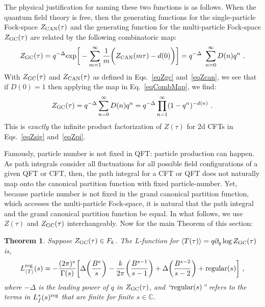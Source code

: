 \documentclass[11pt,a4paper]{article}
\newcommand{\G}{\Gamma}
\newtheorem{thm}{Theorem}[section]
\def\C{\mathbb{C}}
\newcommand{\reg}{{\rm reg}}
\begin{document}
The physical justification for naming these two functions is as follows. When the quantum field theory is free, then the generating functions for the single-particle Fock-space $Z_{\rm CAN}(\tau)$ and the generating function for the multi-particle Fock-space $Z_{\rm GC}(\tau)$ are related by the following combinatoric map:
\begin{align}
Z_{\rm GC}(\tau) = q^{-\Delta} {\rm exp}\bigg[- \sum_{m = 1}^{\infty} \frac{1}{m} \bigg( Z_{\rm CAN}(m \tau) - d(0) \bigg) \bigg] = q^{-\Delta} ~\sum_{n = 0}^{\infty} D(n) q^n~. \label{eqCombMap}
\end{align}
With $Z_{\rm GC}(\tau)$ and $Z_{\rm CAN}(\tau)$ as defined in Eqs.~\eqref{eqZgc} and~\eqref{eqZcan}, we see that if $D(0) = 1$ then applying the map in Eq.~\eqref{eqCombMap}, we find:
\begin{align}
Z_{\rm GC}(\tau) = q^{-\Delta} \sum_{n = 0}^{\infty} D(n)q^n = q^{-\Delta} \prod_{n = 1}^{\infty} (1-q^n)^{-d(n)}~.
\end{align}
This is {\em exactly} the infinite product factorization of $Z(\tau)$ for 2d CFTs in Eqs.~\eqref{eqZsig} and~\eqref{eqZpi}.

Famously, particle number is not fixed in QFT: particle production can happen. As path integrals consider all fluctuations for all possible field configurations of a given QFT or CFT, then, the path integral for a CFT or QFT does not naturally map onto the canonical partition function with fixed particle-number. Yet, because particle number is not fixed in the grand canonical partition function, which accesses the multi-particle Fock-space, it is natural that the path integral and the grand canonical partition function be equal. In what follows, we use $Z(\tau)$ and $Z_{\rm GC}(\tau)$ interchangeably. Now for the main Theorem of this section:

\begin{thm}\label{ThmTrex}
Suppose $Z_{\rm GC}(\tau) \in F_k$. The L-function for $\langle T(\tau) \rangle = q \partial_q \log Z_{\rm GC}(\tau)$ is,
\begin{align}
L_{\langle T \rangle}^\reg(s) = -\frac{(2 \pi)^s}{\G(s)} \bigg[ \Delta\bigg(\frac{B^s}{s}\bigg) - \frac{k}{2 \pi} \bigg( \frac{B^{s-1}}{s-1} \bigg) + \Delta \bigg(\frac{B^{s-2}}{s-2}\bigg)
+ {\rm regular}(s) \bigg]~,
\label{eqThmTrex1}
\end{align}
where $-\Delta$ is the leading power of $q$ in $Z_{\rm GC}(\tau)$, and ``${\rm regular}(s)$'' refers to the terms in $L_f^*(s)^\reg$ that are finite for finite $s \in \C$. 
\end{thm}
\end{document}
